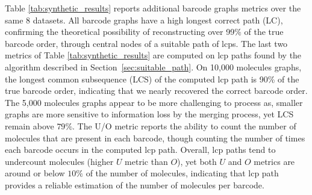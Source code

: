 \documentclass[a4paper,UKenglish,cleveref, autoref, thm-restate,authorcolumns]{lipics-v2019}
\begin{document}
Table \ref{tab:synthetic_results} reports additional barcode graphs metrics over the same 8 datasets.
All barcode graphs have a high longest correct path (LC), confirming the theoretical possibility of reconstructing over 99\% of the true barcode order, through central nodes of a suitable path of lcps.
The last two metrics of Table \ref{tab:synthetic_results} are computed on lcp paths found by the algorithm described in Section~\ref{sec:suitable_path}. On 10,000 molecules graphs, the longest common subsequence (LCS) of the computed lcp path is 90\% of the true barcode order, indicating that we nearly recovered the correct barcode order. The 5,000 molecules graphs appear to be more challenging to process as, smaller graphs are more sensitive to information loss by the merging process, yet LCS remain above $79\%$. %
The U/O metric reports the ability to count the number of molecules that are present in each barcode, though counting the number of times each barcode occurs in the computed lcp path. %
Overall, lcp paths tend to undercount molecules (higher $U$ metric than $O$), yet both $U$ and $O$ metrics are around or below $10\%$ of the number of molecules, indicating that lcp path provides a reliable estimation of the number of molecules per barcode.

\end{document}
